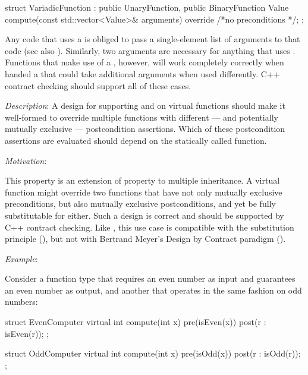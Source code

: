 \begin{codeblock}
struct VariadicFunction : public UnaryFunction, public BinaryFunction {
  Value compute(const std::vector<Value>& arguments) override
    /*no preconditions */;
};
\end{codeblock}

Any code that uses a  is obliged to pass a single-element list of arguments to that
code (see also ). Similarly, two arguments are necessary for anything that uses . Functions that make use of a , however, will work completely correctly when handed a  that could take additional arguments when used differently. C++ contract checking should support all of these cases.


\emph{Description}:
A design for supporting  and  on virtual functions should make it well-formed to override multiple functions with different --- and potentially mutually exclusive --- postcondition assertions. Which of these postcondition assertions are evaluated should depend on the statically called function. 

\emph{Motivation}:

This property is an extension of property  to multiple inheritance. A virtual function might override two functions that have not only mutually exclusive preconditions, but also mutually exclusive postconditions, and yet be fully substitutable for either. Such a design is correct and should be supported by C++ contract checking. Like  , this use case is compatible with the substitution principle (), but not with Bertrand Meyer’s Design by Contract paradigm (). 

\emph{Example}:

Consider a function type that requires
an even number as input and guarantees an even number as output, and another that operates in
the same fashion on odd numbers:

\begin{codeblock}
struct EvenComputer {
  virtual int compute(int x)
    pre(isEven(x))
    post(r : isEven(r));
};

struct OddComputer {
  virtual int compute(int x)
    pre(isOdd(x))
    post(r : isOdd(r));
};
\end{codeblock}

